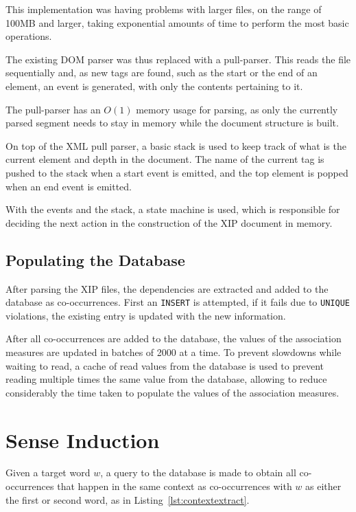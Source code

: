 This implementation was having problems with larger files, on the range of
100MB and larger, taking exponential amounts of time to perform the most basic
operations.

The existing \ac{DOM} parser was thus replaced with a pull-parser. This reads
the file sequentially and, as new tags are found, such as the start or the
end of an element, an event is generated, with only the contents pertaining to 
it.

The pull-parser has an $O(1)$ memory usage for parsing, as only the currently
parsed segment needs to stay in memory while the document structure is built.

On top of the XML pull parser, a basic stack is used to keep track of what is
the current element and depth in the document. The name of the current tag
is pushed to the stack when a start event is emitted, and the top element is
popped when an end event is emitted.

With the events and the stack, a state machine is used, which is responsible for
deciding the next action in the construction of the XIP document in memory.

\subsection{Populating the Database}

After parsing the \ac{XIP} files, the dependencies are extracted and added to 
the database as co-occurrences. First an \texttt{INSERT} is attempted, if it 
fails due to \texttt{UNIQUE} violations, the existing entry is updated with the 
new information.

After all co-occurrences are added to the database, the values of the
association measures are updated in batches of 2000 at a time. To prevent
slowdowns while waiting to read, a cache of read values from the database is
used to prevent reading multiple times the same value from the database,
allowing to reduce considerably the time taken to populate the values of the 
association measures.

\section{Sense Induction}

Given a target word $w$, a query to the database is made to obtain all
co-occurrences that happen in the same context as co-occurrences with $w$ as
either the first or second word, as in Listing~\ref{lst:contextextract}.

